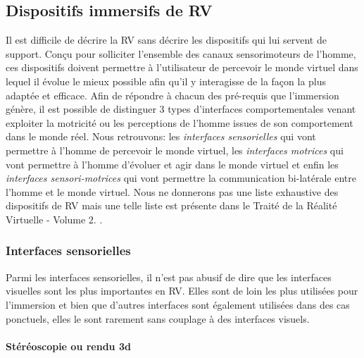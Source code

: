 \subsection{Dispositifs immersifs de RV}

Il est difficile de décrire la RV sans décrire les dispositifs qui lui servent de support. Conçu pour solliciter l'ensemble des canaux sensorimoteurs de l'homme, ces dispositifs doivent permettre à l'utilisateur de percevoir le monde virtuel dans lequel il évolue le mieux possible afin qu'il y interagisse de la façon la plus adaptée et efficace.
Afin de répondre à chacun des pré-requis que l'immersion génère, il est possible de distinguer 3 types d'interfaces comportementales venant exploiter la motricité ou les perceptions de l'homme issues de son comportement dans le monde réel.
Nous retrouvons: les \textit{interfaces sensorielles} qui vont permettre à l'homme de percevoir le monde virtuel, les \textit{interfaces motrices} qui vont permettre à l'homme d'évoluer et agir dans le monde virtuel et enfin les \textit{interfaces sensori-motrices} qui vont permettre la communication bi-latérale entre l'homme et le monde virtuel.
Nous ne donnerons pas une liste exhaustive des dispositifs de RV mais une telle liste est présente dans le Traité de la Réalité Virtuelle - Volume 2. \cite{fuchs2006traite}.

\subsubsection{Interfaces sensorielles} \label{interface_sensor}

Parmi les interfaces sensorielles, il n'est pas abusif de dire que les interfaces visuelles sont les plus importantes en RV. Elles sont de loin les plus utilisées pour l'immersion et bien que d'autres interfaces sont également utilisées dans des cas ponctuels, elles le sont rarement sans couplage à des interfaces visuels.

\paragraph{Stéréoscopie ou rendu 3d}

